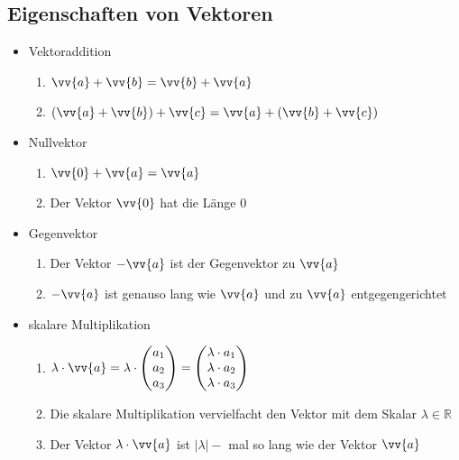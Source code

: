 \subsection{Eigenschaften von Vektoren}
\begin{itemize}
\item Vektoraddition\\
\begin{enumerate}
\item $\vv{a} +\vv{b} = \vv{b} + \vv{a}$\\
\item $\left( \vv{a}+\vv{b}\right)+\vv{c} = \vv{a} +\left(\vv{b} +\vv{c}\right)$
\end{enumerate}
\item Nullvektor\\
\begin{enumerate}
\item $\vv{0} +\vv{a} = \vv{a}$ \item Der Vektor $\vv{0}$ hat die Länge $0$
\end{enumerate}
\item Gegenvektor\\
\begin{enumerate}
\item Der Vektor $-\vv{a}$ ist der Gegenvektor zu $\vv{a}$\\
\item $-\vv{a}$ ist genauso lang wie $\vv{a}$ und  zu $\vv{a}$ entgegengerichtet
\end{enumerate}
\item skalare Multiplikation\\
\begin{enumerate}
\item $\lambda \cdot \vv{a} = \lambda \cdot \begin{pmatrix} a_1 \\ a_2 \\ a_3 \end{pmatrix} = \begin{pmatrix} \lambda \cdot a_1 \\ \lambda \cdot a_2 \\ \lambda \cdot a_3 \end{pmatrix}$\\
\item Die skalare Multiplikation vervielfacht den Vektor mit dem Skalar $\lambda \in \mathds{R}$\\
\item Der Vektor $\lambda\cdot \vv{a}$ ist $| \lambda |-$ mal so lang wie der Vektor $\vv{a}$\\

\end{enumerate}
\end{itemize}

